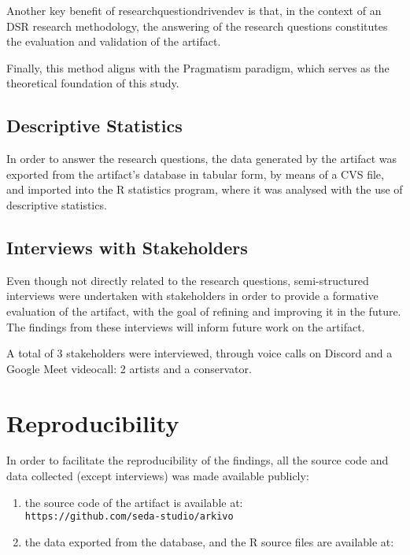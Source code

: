 Another key benefit of \gls{researchquestiondrivendev} is that, in the context of an DSR research methodology, the answering of the research questions constitutes the evaluation and validation of the artifact.

Finally, this method aligns with the Pragmatism paradigm, which serves as the theoretical foundation of this study.

\subsection{Descriptive Statistics}

In order to answer the research questions, the data generated by the artifact was exported from the artifact's database in tabular form, by means of a CVS file, and imported into the R statistics program, where it was analysed with the use of descriptive statistics.

\subsection{Interviews with Stakeholders}

Even though not directly related to the research questions, semi-structured interviews were undertaken with stakeholders in order to provide a formative evaluation of the artifact, with the goal of refining and improving it in the future. The findings from these interviews will inform future work on the artifact.

\todo
A total of 3 stakeholders were interviewed, through voice calls on Discord and a Google Meet videocall: 2 artists and a conservator.


\section{Reproducibility}

In order to facilitate the reproducibility of the findings, all the source code and data collected (except interviews) was made available publicly:

\begin{enumerate}
    \item the source code of the artifact is available at:\\ \texttt{https://github.com/seda-studio/arkivo}
    \item the data exported from the database, and the R source files are available at: \todo
\end{enumerate}


